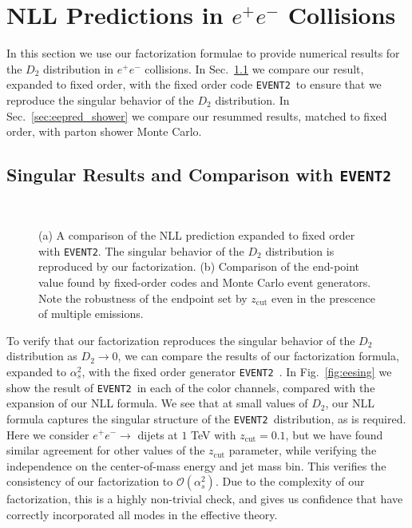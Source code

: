 \documentclass[a4paper,11pt]{article}
\newcommand{\eventtwo}{\texttt{EVENT2}}
\def\zcut{z_{\text{cut}}}
\DeclareRobustCommand{\Sec}[1]{Sec.~\ref{#1}}
\DeclareRobustCommand{\Fig}[1]{Fig.~\ref{#1}}
\begin{document}
\section{NLL Predictions in $e^+e^-$ Collisions}\label{sec:eepred}


In this section we use our factorization formulae to provide numerical results for the $D_2$ distribution in $e^+e^-$ collisions. In \Sec{sec:eepred_singular} we compare our result, expanded to fixed order, with the fixed order code \eventtwo~to ensure that we reproduce the singular behavior of the $D_2$ distribution. In \Sec{sec:eepred_shower} we compare our resummed results, matched to fixed order, with parton shower Monte Carlo.






\subsection{Singular Results and Comparison with \eventtwo}\label{sec:eepred_singular}

\begin{figure}
\begin{center}
\ \ 
\end{center}
\caption{(a) A comparison of the NLL prediction expanded to fixed order with \eventtwo. The singular behavior of the $D_2$ distribution is reproduced by our factorization. (b) Comparison of the end-point value found by fixed-order codes and Monte Carlo event generators. Note the robustness of the endpoint set by $\zcut$ even in the prescence of multiple emissions.
}
\label{fig:eec_event2}
\end{figure}


To verify that our factorization reproduces the singular behavior of the $D_2$ distribution as $D_2\to 0$, we can compare the results of our factorization formula, expanded to $\alpha_s^2$, with the fixed order generator \eventtwo~\cite{Catani:1996vz}. In \Fig{fig:eesing} we show the result of \eventtwo~in each of the color channels, compared with the expansion of our NLL formula.  We see that at small values of $D_2$, our NLL formula captures the singular structure of the \eventtwo~distribution, as is required. Here we consider $e^+e^-\to$ dijets at $1$ TeV with $\zcut =0.1$, but we have found similar agreement for other values of the $\zcut$ parameter, while verifying the independence on the center-of-mass energy and jet mass bin. This verifies the consistency of our factorization to $\mathcal{O}(\alpha_s^2)$. Due to the complexity of our factorization, this is a highly non-trivial check, and gives us confidence that have correctly incorporated all modes in the effective theory.
\end{document}

